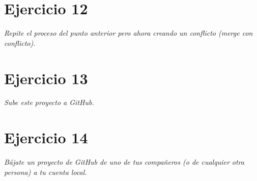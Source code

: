 \section{Ejercicio 12}
\begin{center}
    \parbox{12cm}{\justify\textit{
        Repite el proceso del punto anterior pero ahora creando un conflicto (merge con conflicto).
    }}
\end{center}

\section{Ejercicio 13}
\begin{center}
    \parbox{12cm}{\justify\textit{
        Sube este proyecto a GitHub.
    }}
\end{center}

\section{Ejercicio 14}
\begin{center}
    \parbox{12cm}{\justify\textit{
        Bájate un proyecto de GitHub de uno de tus compañeros (o de cualquier otra  persona) a tu cuenta local.
    }}
\end{center}